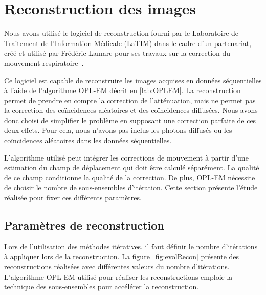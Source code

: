 
\section{Reconstruction des images}

Nous avons utilisé le logiciel de reconstruction fourni par le Laboratoire de Traitement de l'Information Médicale (LaTIM) dans le cadre d'un partenariat, créé et utilisé par Frédéric Lamare pour ses travaux sur la correction du mouvement respiratoire~\cite{lamare2007list}.

Ce logiciel est capable de reconstruire les images acquises en données séquentielles à l'aide de l'algorithme OPL-EM décrit en \ref{lab:OPLEM}. La reconstruction permet de prendre en compte la correction de l'atténuation, mais ne permet pas la correction des coïncidences aléatoires et des coïncidences diffusées. Nous avons donc choisi de simplifier le problème en supposant une correction parfaite de ces deux effets. Pour cela, nous n'avons pas inclus les photons diffusés ou les coïncidences aléatoires dans les données séquentielles. 

L'algorithme utilisé peut intégrer les corrections de mouvement à partir d'une estimation du champ de déplacement qui doit être calculé séparément. La qualité de ce champ conditionne la qualité de la correction. De plus, OPL-EM nécessite de choisir le nombre de sous-ensembles d'itération. Cette section présente l'étude réalisée pour fixer ces différents paramètres.

\subsection{Paramètres de reconstruction}
\label{lab:paramRecon}

Lors de l'utilisation des méthodes itératives, il faut définir le nombre d'itérations à appliquer lors de la reconstruction. La figure~\ref{fig:evolRecon} présente des reconstructions  réalisées avec différentes valeurs du nombre d'itérations. L'algorithme OPL-EM utilisé pour réaliser les reconstructions emploie la technique des sous-ensembles pour accélérer la reconstruction.

